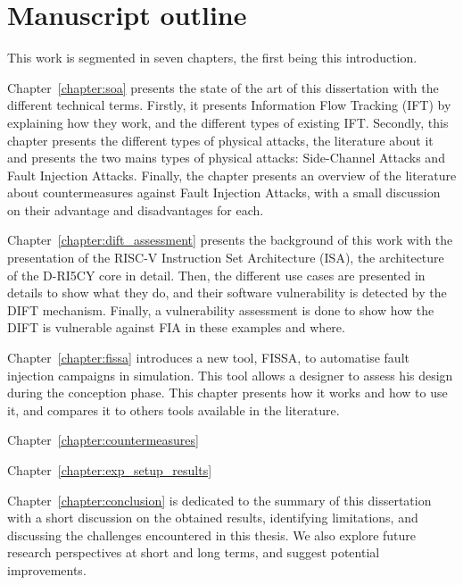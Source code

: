 \section{Manuscript outline}

This work is segmented in seven chapters, the first being this introduction.

Chapter~\ref{chapter:soa} presents the state of the art of this dissertation with the different technical terms. Firstly, it presents Information Flow Tracking (IFT) by explaining how they work, and the different types of existing IFT.
Secondly, this chapter presents the different types of physical attacks, the literature about it and presents the two mains types of physical attacks: Side-Channel Attacks and Fault Injection Attacks.
Finally, the chapter presents an overview of the literature about countermeasures against Fault Injection Attacks, with a small discussion on their advantage and disadvantages for each.

Chapter~\ref{chapter:dift_assessment} presents the background of this work with the presentation of the RISC-V Instruction Set Architecture (ISA), the architecture of the D-RI5CY core in detail. Then, the different use cases are presented in details to show what they do, and their software vulnerability is detected by the DIFT mechanism. Finally, a vulnerability assessment is done to show how the DIFT is vulnerable against FIA in these examples and where.

Chapter~\ref{chapter:fissa} introduces a new tool, FISSA, to automatise fault injection campaigns in simulation. This tool allows a designer to assess his design during the conception phase. This chapter presents how it works and how to use it, and compares it to others tools available in the literature.

Chapter~\ref{chapter:countermeasures}  %

Chapter~\ref{chapter:exp_setup_results} 

Chapter~\ref{chapter:conclusion} is dedicated to the summary of this dissertation with a short discussion on the obtained results, identifying limitations, and discussing the challenges encountered in this thesis.
We also explore future research perspectives at short and long terms, and suggest potential improvements.



